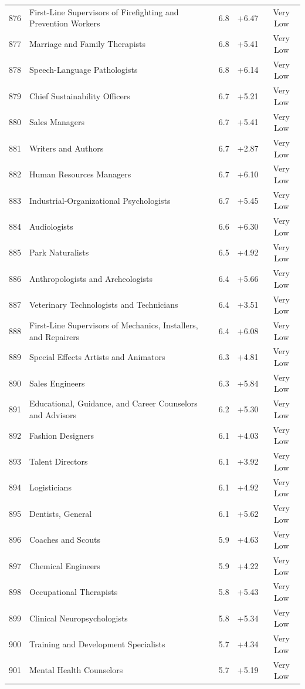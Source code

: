 {\begin{longtable}{rp{7cm}ccc}
876 & First-Line Supervisors of Firefighting and Prevention Workers & 6.8 & +6.47 & Very Low \\
877 & Marriage and Family Therapists & 6.8 & +5.41 & Very Low \\
878 & Speech-Language Pathologists & 6.8 & +6.14 & Very Low \\
879 & Chief Sustainability Officers & 6.7 & +5.21 & Very Low \\
880 & Sales Managers & 6.7 & +5.41 & Very Low \\
881 & Writers and Authors & 6.7 & +2.87 & Very Low \\
882 & Human Resources Managers & 6.7 & +6.10 & Very Low \\
883 & Industrial-Organizational Psychologists & 6.7 & +5.45 & Very Low \\
884 & Audiologists & 6.6 & +6.30 & Very Low \\
885 & Park Naturalists & 6.5 & +4.92 & Very Low \\
886 & Anthropologists and Archeologists & 6.4 & +5.66 & Very Low \\
887 & Veterinary Technologists and Technicians & 6.4 & +3.51 & Very Low \\
888 & First-Line Supervisors of Mechanics, Installers, and Repairers & 6.4 & +6.08 & Very Low \\
889 & Special Effects Artists and Animators & 6.3 & +4.81 & Very Low \\
890 & Sales Engineers & 6.3 & +5.84 & Very Low \\
891 & Educational, Guidance, and Career Counselors and Advisors & 6.2 & +5.30 & Very Low \\
892 & Fashion Designers & 6.1 & +4.03 & Very Low \\
893 & Talent Directors & 6.1 & +3.92 & Very Low \\
894 & Logisticians & 6.1 & +4.92 & Very Low \\
895 & Dentists, General & 6.1 & +5.62 & Very Low \\
896 & Coaches and Scouts & 5.9 & +4.63 & Very Low \\
897 & Chemical Engineers & 5.9 & +4.22 & Very Low \\
898 & Occupational Therapists & 5.8 & +5.43 & Very Low \\
899 & Clinical Neuropsychologists & 5.8 & +5.34 & Very Low \\
900 & Training and Development Specialists & 5.7 & +4.34 & Very Low \\
901 & Mental Health Counselors & 5.7 & +5.19 & Very Low \\

\end{longtable}}

